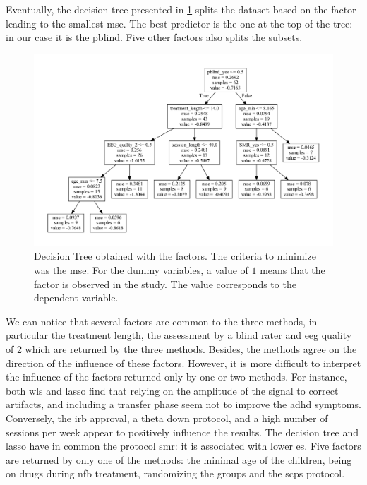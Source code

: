 Eventually, the decision tree presented in \cref{Figure:factors_analysis_decision_tree_results} splits the dataset based on the factor leading to the
smallest \gls{mse}. The best predictor is the one at the top of the tree: in our case it is the \gls{pblind}. Five other factors also splits the subsets. 

\begin{figure}[h!]
  \centering
  \includegraphics[width=1.0\linewidth]{figures/factors_analysis_decision_tree_results_no_colors_2-columns_fitting_image}
  \caption{Decision Tree obtained with the factors. The criteria to minimize was the \gls{mse}. For the dummy variables, a value of $1$ means
	that the factor is observed in the study. The value corresponds to the dependent variable.}
  \label{Figure:factors_analysis_decision_tree_results}
\end{figure}

We can notice that several factors are common to the three methods, in particular the treatment length, the assessment 
by a blind rater and \gls{eeg} quality of 2 which are returned by the three methods. Besides, 
the methods agree on the direction of the influence of these factors. However, it is more difficult to interpret the influence of the factors 
returned only by one or two methods. For instance, both \gls{wls} and \gls{lasso} find that  
relying on the amplitude of the signal to correct artifacts, and including a transfer phase seem not to improve the \gls{adhd} symptoms. 
Conversely, the \gls{irb} approval, a theta down protocol, and a high number of sessions per week appear to 
positively influence the results. The decision tree and \gls{lasso} have in common the protocol \gls{smr}: it is associated with lower \gls{es}.
Five factors are returned by only one of the methods: the minimal age of the children, being on drugs 
during \gls{nfb} treatment, randomizing the groups and the \glspl{scp} protocol. 

